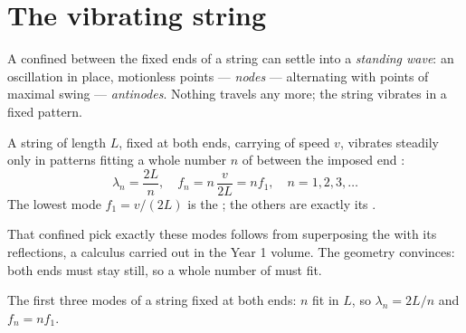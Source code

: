 \section{The vibrating string}

\begin{definition}\label{def:g12:sound-acoustics:standing-wave}
A  confined between the fixed ends of a string can settle into a
\emph{standing wave}: an oscillation in place,
motionless points --- \emph{nodes} --- alternating with
points of maximal swing --- \emph{antinodes}.
Nothing travels any more; the string vibrates in a fixed pattern.
\end{definition}

\begin{proposition}\label{prop:g12:sound-acoustics:string-modes}
A string of length $L$, fixed at both ends, carrying  of speed
$v$, vibrates steadily only in patterns fitting a whole number $n$
of  between the imposed end :
\[ \lambda_n = \frac{2L}{n}, \quad f_n = n\,\frac{v}{2L} = n f_1, \quad n = 1, 2, 3, \dots \]
The lowest mode $f_1 = v/(2L)$ is the ; the others are
exactly its . \admitted
\end{proposition}

\begin{remark}\label{rem:g12:sound-acoustics:honest}
That confined  pick exactly these modes follows from
superposing the  with its reflections, a calculus carried out in
the Year 1 volume. The geometry convinces: both ends must stay
still, so a whole number of  must fit.
\end{remark}

\begin{omfigure}

{\small The first three modes of a string fixed at both ends: $n$
 fit in $L$, so $\lambda_n = 2L/n$ and $f_n = nf_1$.}
\end{omfigure}

